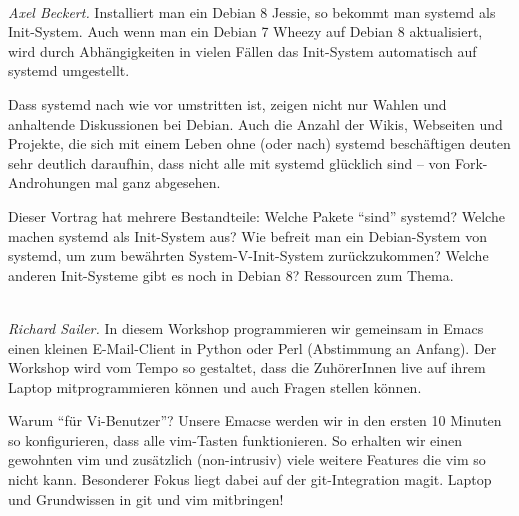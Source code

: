 \documentclass[10pt,a4paper,ngerman]{scrartcl}
\let\origdescription\description
\renewenvironment{description}{
  \setlength{\leftmargini}{0em}
  \origdescription
  \setlength{\itemindent}{0em}
  \setlength{\itemsep}{1.2em}
  \setlength{\labelsep}{\textwidth}
}
{\endlist}
\newcommand{\vorschub}{\mbox{}\\[-0.5em]}
\begin{document}
\begin{multicols}{2}
\begin{description}
\item[Wie betreibt man Debian 8 Jessie ohne systemd?]\vorschub
\textsl{Axel Beckert.}
Installiert man ein Debian 8 Jessie, so bekommt man systemd als Init-System. Auch wenn man ein Debian 7 Wheezy auf Debian 8 aktualisiert, wird durch Abhängigkeiten in vielen Fällen das Init-System automatisch auf systemd umgestellt.

Dass systemd nach wie vor umstritten ist, zeigen nicht nur Wahlen und anhaltende Diskussionen bei Debian. Auch die Anzahl der Wikis, Webseiten und Projekte, die sich mit einem Leben ohne (oder nach) systemd beschäftigen deuten sehr deutlich daraufhin, dass nicht alle mit systemd glücklich sind – von Fork-Androhungen mal ganz abgesehen.

Dieser Vortrag hat mehrere Bestandteile: Welche Pakete "`sind"' systemd? Welche machen systemd als Init-System aus? Wie befreit man ein Debian-System von systemd, um zum bewährten System-V-Init-System zurückzukommen? Welche anderen Init-Systeme gibt es noch in Debian 8? Ressourcen zum Thema.

\end{description}

\end{multicols}

\vfill
\begin{center}\parbox{0.6\textwidth}{%
\begin{description}
\item[Workshop von 10:45 Uhr bis 12:30 Uhr: Git und Emacs für Vi-Benutzer]\vorschub
\textsl{Richard Sailer.}
In diesem Workshop programmieren wir gemeinsam in Emacs einen kleinen E-Mail-Client in Python oder Perl (Abstimmung an Anfang). Der Workshop wird vom Tempo so gestaltet, dass die ZuhörerInnen live auf ihrem Laptop mitprogrammieren können und auch Fragen stellen können.

Warum "`für Vi-Benutzer"'? Unsere Emacse werden wir in den ersten 10 Minuten so konfigurieren, dass alle vim-Tasten funktionieren. So erhalten wir einen gewohnten vim und zusätzlich (non-intrusiv) viele weitere Features die vim so nicht kann.
Besonderer Fokus liegt dabei auf der git-Integration magit. Laptop und Grundwissen in git und vim mitbringen!
\end{description}
}\end{center}

\newpage
\end{document}
